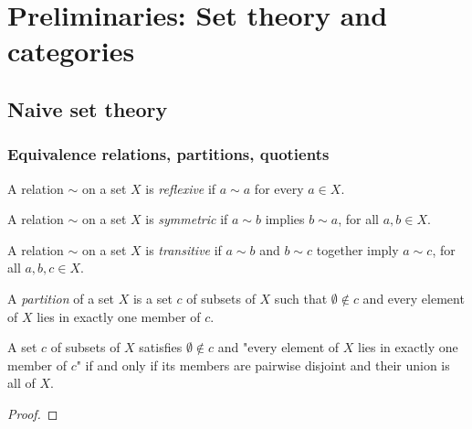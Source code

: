 \chapter{Preliminaries: Set theory and categories}
\label{chap:prelims}

\section{Naive set theory}
\label{sec:prelims:naive-set-theory}

\subsection{Equivalence relations, partitions, quotients}
\label{subsec:prelims:equivalence-relations}

\begin{definition}
  \label{def:prelims:is-reflexive}
  \leanok
  A relation $\sim$ on a set $X$ is \emph{reflexive} if $a \sim a$ for
  every $a \in X$.
\end{definition}

\begin{definition}
  \label{def:prelims:is-symmetric}
  \leanok
  A relation $\sim$ on a set $X$ is \emph{symmetric} if $a \sim b$
  implies $b \sim a$, for all $a, b \in X$.
\end{definition}

\begin{definition}
  \label{def:prelims:is-transitive}
  \leanok
  A relation $\sim$ on a set $X$ is \emph{transitive} if $a \sim b$ and
  $b \sim c$ together imply $a \sim c$, for all $a, b, c \in X$.
\end{definition}

\begin{definition}[Partition]
  \label{def:prelims:is-partition}
  \leanok
  A \emph{partition} of a set $X$ is a set $c$ of subsets of $X$ such
  that $\emptyset \notin c$ and every element of $X$ lies in exactly
  one member of $c$.
\end{definition}

\begin{proposition}
  \label{prop:prelims:is-partition-iff-pairwise-disjoint-cover}
  \leanok
  A set $c$ of subsets of $X$ satisfies $\emptyset \notin c$ and "every
  element of $X$ lies in exactly one member of $c$" if and only if its
  members are pairwise disjoint and their union is all of $X$.
\end{proposition}
\begin{proof}
  \leanok
\end{proof}


